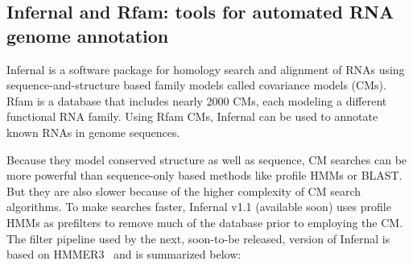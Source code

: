 \documentclass[custom,landscape,final,30pt,plainboxedsections]{sciposter-titleskipsmall}
\begin{document}
\begin{multicols}{3}
\section*{Infernal and Rfam: tools for automated RNA genome annotation}
Infernal is a software package for homology search and alignment of
RNAs using sequence-and-structure based family models called
covariance models (CMs). Rfam is a database that includes nearly 2000
CMs, each modeling a different functional RNA family. Using Rfam CMs,
Infernal can be used to annotate known RNAs in genome sequences.


\vspace{0.2in}

Because they model conserved structure as well as sequence, CM
searches can be more powerful than sequence-only based methods like
profile HMMs or BLAST. But they are also slower because of the higher
complexity of CM search algorithms.  To make searches faster, Infernal
v1.1 (available soon)
uses profile HMMs as prefilters to remove much of the database prior
to employing the CM. The filter pipeline used by the next, soon-to-be
released, version of Infernal is based on HMMER3~\cite{hmmer} and is
summarized below:



\end{multicols}
\end{document}
